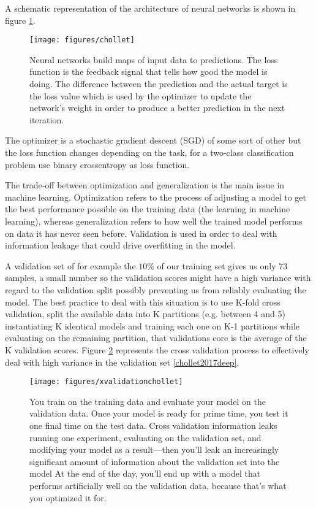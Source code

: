 \documentclass[11pt]{article}
\theoremstyle{definition}
\theoremstyle{remark}
\begin{document}
{\begin{itemize}
\end{itemize}
A schematic representation of the architecture of neural networks is shown in figure \ref{fig:cholletfig}.

\begin{figure}[H]
        \centering
        \texttt{[image: figures/chollet]}
        \caption{Neural networks build maps of input data to predictions. The loss function is the feedback signal that tells how good the model is doing. The difference between the prediction and the actual target is the loss value which is used by the optimizer to update the network's weight in order to produce a better prediction in the next iteration.
        } \label{fig:cholletfig}
\end{figure}

The optimizer is a stochastic gradient descent (SGD) of some sort of other but the loss function changes depending on the task, for a two-class classification problem use binary crossentropy as loss function. 

The trade-off between optimization and generalization is the main issue in machine learning. Optimization refers to the process of adjusting a model to get the best performance possible on the training data (the learning in machine learning), whereas generalization refers to how well the trained model performs on data it has never seen before.
Validation is used in order to deal with information leakage that could drive overfitting in the model.

A validation set of for example the $10\%$ of our training set gives us only 73 samples, a small number so the validation scores might have a high variance with regard to the validation split possibly preventing us from reliably evaluating the model. The best practice to deal with this situation is to use K-fold cross validation, split the available data into K partitions (e.g. between 4 and 5) instantiating K identical models and training each one on K-1 partitions while evaluating on the remaining partition, that validations core is the average of the K validation scores.  Figure \ref{fig:xvalchollet} represents the cross validation process to effectively deal with high variance in the validation set \ref{chollet2017deep}. 
\begin{figure}[H]
        \centering
        \texttt{[image: figures/xvalidationchollet]}
        \caption{You train on the training data and evaluate your model on the validation data. Once your model is ready for prime time, you test it one final time on the test data. Cross validation  information leaks running one experiment, evaluating on the validation set, and modifying your model as a result—then you’ll leak an increasingly significant amount of information about the validation set into the model At the end of the day, you’ll end up with a model that performs artificially well on the validation data, because that’s what you optimized it for.
        } \label{fig:xvalchollet}
\end{figure}

}
\end{document}
